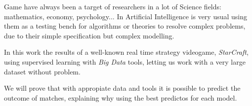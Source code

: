 Game have always been a target of researchers in a lot of Science fields:
mathematics, economy, psychology... In Artificial Intelligence is very usual
using them as a testing bench for algorithms or theories to resolve complex
problems, due to their simple specification but complex modelling.

In this work the results of a well-known real time strategy videogame,
\emph{StarCraft}, using supervised learning with \emph{Big Data} tools,
letting us work with a very large dataset without problem.

We will prove that with appropiate data and tools it is possible to
predict the outcome of matches, explaining why using the best predictos for
each model. 
